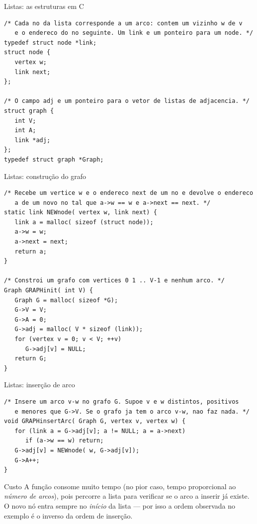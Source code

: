 \documentclass[aspectratio=169]{beamer}
\begin{document}
\begin{frame}[fragile]{Listas: as estruturas em C}
\begin{lstlisting}
/* Cada no da lista corresponde a um arco: contem um vizinho w de v
   e o endereco do no seguinte. Um link e um ponteiro para um node. */
typedef struct node *link;
struct node {
   vertex w;
   link next;
};

/* O campo adj e um ponteiro para o vetor de listas de adjacencia. */
struct graph {
   int V;
   int A;
   link *adj;
};
typedef struct graph *Graph;
\end{lstlisting}
\end{frame}

\begin{frame}[fragile]{Listas: construção do grafo}
\begin{lstlisting}[basicstyle=\ttfamily\tiny]
/* Recebe um vertice w e o endereco next de um no e devolve o endereco
   a de um novo no tal que a->w == w e a->next == next. */
static link NEWnode( vertex w, link next) {
   link a = malloc( sizeof (struct node));
   a->w = w;
   a->next = next;
   return a;
}

/* Constroi um grafo com vertices 0 1 .. V-1 e nenhum arco. */
Graph GRAPHinit( int V) {
   Graph G = malloc( sizeof *G);
   G->V = V;
   G->A = 0;
   G->adj = malloc( V * sizeof (link));
   for (vertex v = 0; v < V; ++v)
      G->adj[v] = NULL;
   return G;
}
\end{lstlisting}
\end{frame}

\begin{frame}[fragile]{Listas: inserção de arco}
\begin{lstlisting}
/* Insere um arco v-w no grafo G. Supoe v e w distintos, positivos
   e menores que G->V. Se o grafo ja tem o arco v-w, nao faz nada. */
void GRAPHinsertArc( Graph G, vertex v, vertex w) {
   for (link a = G->adj[v]; a != NULL; a = a->next)
      if (a->w == w) return;
   G->adj[v] = NEWnode( w, G->adj[v]);
   G->A++;
}
\end{lstlisting}
  \begin{alertblock}{Custo}
    {\small A função consome muito tempo (no pior caso, tempo proporcional ao
    \emph{número de arcos}), pois percorre a lista para verificar se o arco a
    inserir já existe. O novo nó entra sempre no \emph{início} da lista --- por
    isso a ordem observada no exemplo é o inverso da ordem de inserção.}
  \end{alertblock}
\end{frame}
\end{document}
